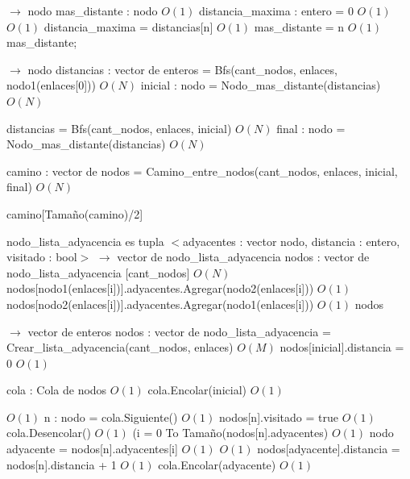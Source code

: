 \documentclass[a4paper, 10pt, twoside]{article}
\newenvironment{pseudo}[1][]{%
    \vspace{1em}%
    \begin{algorithmic}%
}
{%
    \end{algorithmic}%
    \vspace{1em}%
}
\newcommand{\Ode}[1]{\hfill $O(#1)$}
\begin{document}
\begin{pseudo}
 $\rightarrow$ nodo
  \State mas\_distante : nodo                         \Ode{1}
  \State distancia\_maxima : entero = 0                   \Ode{1}
                    \Ode{1}
      \State distancia\_maxima = distancias[n]                \Ode{1}
      \State mas\_distante = n                        \Ode{1}
    \EndIf
  \EndFor
  \Return mas\_distante;
\EndProcedure

 $\rightarrow$ nodo
  \State distancias : vector de enteros = Bfs(cant\_nodos, enlaces, nodo1(enlaces[0])) \Ode{N}
  \State inicial : nodo = Nodo\_mas\_distante(distancias)           \Ode{N}

  \State distancias = Bfs(cant\_nodos, enlaces, inicial)            \Ode{N}
  \State final : nodo = Nodo\_mas\_distante(distancias)           \Ode{N}

  \State camino : vector de nodos = Camino\_entre\_nodos(cant\_nodos, enlaces, inicial, final) \Ode{N}
  
  \Return camino[Tamaño(camino)/2]
\EndProcedure

nodo\_lista\_adyacencia es tupla $<$adyacentes : vector nodo, distancia : entero, visitado : bool$>$
 $\rightarrow$ vector de nodo\_lista\_adyacencia
  \State nodos : vector de nodo\_lista\_adyacencia [cant\_nodos]        \Ode{N}
    \State nodos[nodo1(enlaces[i])].adyacentes.Agregar(nodo2(enlaces[i])) \Ode{1}
    \State nodos[nodo2(enlaces[i])].adyacentes.Agregar(nodo1(enlaces[i])) \Ode{1}
   \EndFor
  \Return nodos
\EndProcedure

 $\rightarrow$ vector de enteros
  \State nodos : vector de nodo\_lista\_adyacencia = Crear\_lista\_adyacencia(cant\_nodos, enlaces) \Ode{M}
  \State nodos[inicial].distancia = 0                     \Ode{1}

  \State cola : Cola de nodos                         \Ode{1}
  \State cola.Encolar(inicial)                        \Ode{1}
  
                             \Ode{1}
    \State n : nodo = cola.Siguiente()                    \Ode{1}
    \State nodos[n].visitado = true                     \Ode{1}
    \State cola.Desencolar()                        \Ode{1}
    \For({i = 0 To Tamaño(nodos[n].adyacentes)}               \Ode{1}
      \State nodo adyacente = nodos[n].adyacentes[i]            \Ode{1}
                      \Ode{1}
        \State nodos[adyacente].distancia = nodos[n].distancia + 1    \Ode{1}
        \State cola.Encolar(adyacente)                  \Ode{1}
      \EndIf
    \EndFor
  \EndWhile


\end{pseudo}
\end{document}
